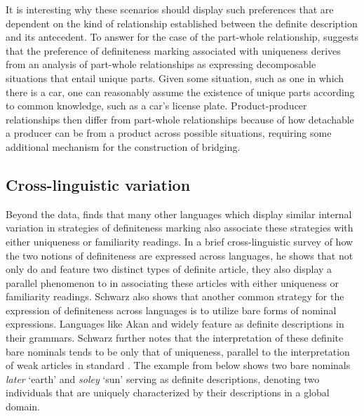 \documentclass[output=paper,modfonts,nonflat]{langsci/langscibook}
\begin{document}
It is interesting why these scenarios should display such preferences that are dependent on the kind of relationship established between the definite description and its antecedent.  To answer for the case of the part-whole relationship, \citet{Schwarz2009} suggests that the preference of definiteness marking associated with uniqueness derives from an analysis of part-whole relationships as expressing decomposable situations that entail unique parts.  Given some situation, such as one in which there is a car, one can reasonably assume the existence of unique parts according to common knowledge, such as a car's license plate.  Product-producer relationships then differ from part-whole relationships because of how detachable a producer can be from a product across possible situations, requiring some additional mechanism for the construction of bridging. 

\subsection{Cross-linguistic variation} \label{sec:cisneros:2.4}

Beyond the  data, \citet{Schwarz2013} finds that many other languages which display similar internal variation in strategies of definiteness marking also associate these strategies with either uniqueness or familiarity readings.  In a brief cross-linguistic survey of how the two notions of definiteness are expressed across languages, he shows that not only do  and  feature two distinct types of definite article, they also display a parallel phenomenon to  in associating these articles with either uniqueness or familiarity readings.  Schwarz also shows that another common strategy for the expression of definiteness across languages is to utilize bare forms of nominal expressions.  Languages like Akan and  widely feature  as definite descriptions in their grammars.  Schwarz further notes that the interpretation of these definite bare nominals tends to be only that of uniqueness, parallel to the interpretation of weak articles in standard .  The example from  below shows two bare nominals \textit{later} `earth' and \textit{soley} `sun' serving as definite descriptions, denoting two individuals that are uniquely characterized by their descriptions in a global domain.
\end{document}
